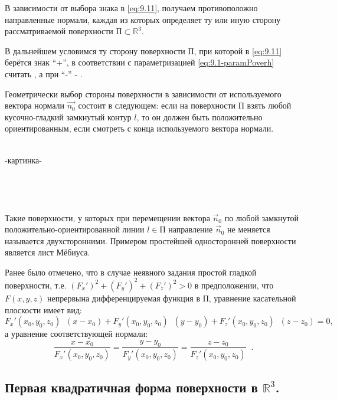 В зависимости от выбора знака в \eqref{eq:9.11}, получаем противоположно направленные нормали, каждая из которых определяет ту или иную сторону рассматриваемой поверхности 
$\text{П} \subset \mathbb{R}^3 $.

В дальнейшем условимся ту сторону поверхности П, при которой в \eqref{eq:9.11} берётся знак ``+'', в соответствии с параметризацией \eqref{eq:9.1-paramPoverh} считать
, а при ``-'' - .

Геометрически выбор стороны поверхности в зависимости от используемого вектора нормали $ \vec{n_0} $ состоит в следующем:
если на поверхности П взять любой кусочно-гладкий замкнутый контур $ l $, то он должен быть положительно ориентированным, если смотреть с конца используемого вектора нормали.


$  $ \\\\-картинка-\\\\\\\\\\

Такие поверхности, у которых при перемещении вектора $ \vec{n}_0 $  по любой замкнутой положительно-ориентированной линии $ l \in \text{П} $ направление $ \vec{n}_0 $ не меняется называется двухсторонними. Примером простейшей односторонней поверхности является лист Мёбиуса.

Ранее было отмечено, что в случае неявного задания простой гладкой поверхности, т.е. $ (F_x')^2 + (F_y')^2 + (F_z')^2 > 0 $ в предположении,
что $ F(x, y, z) $ непрервына дифференцируемая функция в П, уравнение касательной плоскости имеет вид:
\begin{equation*}
    F_x' (x_0, y_0, z_0) \;\; (x-x_0) + 
    F_y' (x_0, y_0, z_0) \;\; (y-y_0) + 
    F_z' (x_0, y_0, z_0) \;\; (z-z_0) = 0,
\end{equation*}
а уравнение соответствующей нормали:
\begin{equation*}
    \dfrac{x-x_0}{F_x'(x_0, y_0, z_0)} = \dfrac{y-y_0}{F_y'(x_0, y_0, z_0)} = \dfrac{z-z_0}{F_z'(x_0, y_0, z_0)} \;\; .
\end{equation*}

\subsection{Первая квадратичная форма поверхности в $ \mathbb{R}^3 $.}

